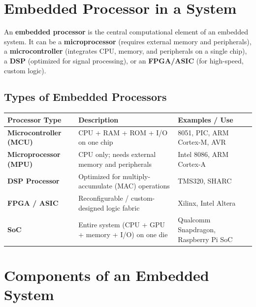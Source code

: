 \documentclass[12pt,a4paper]{article}
\renewcommand{\arraystretch}{1.45}
\begin{document}
\section{Embedded Processor in a System}

\begin{tcolorbox}[defbox, title={\textbf{Embedded Processor}}]
An \textbf{embedded processor} is the central computational element of an embedded system. It can be a \textbf{microprocessor} (requires external memory and peripherals), a \textbf{microcontroller} (integrates CPU, memory, and peripherals on a single chip), a \textbf{DSP} (optimized for signal processing), or an \textbf{FPGA/ASIC} (for high-speed, custom logic).
\end{tcolorbox}

\subsection{Types of Embedded Processors}

\par\noindent
{\renewcommand{\arraystretch}{1.6}%
\begin{tabularx}{\linewidth}{|B{3.0cm}|Y|Y|}
\hline
\textbf{Processor Type} & \textbf{Description} & \textbf{Examples / Use} \\
\hline
\textbf{Microcontroller (MCU)} & CPU + RAM + ROM + I/O on one chip & 8051, PIC, ARM Cortex-M, AVR \\
\hline
\textbf{Microprocessor (MPU)} & CPU only; needs external memory and peripherals & Intel 8086, ARM Cortex-A \\
\hline
\textbf{DSP Processor} & Optimized for multiply-accumulate (MAC) operations & TMS320, SHARC \\
\hline
\textbf{FPGA / ASIC} & Reconfigurable / custom-designed logic fabric & Xilinx, Intel Altera \\
\hline
\textbf{SoC} & Entire system (CPU + GPU + memory + I/O) on one die & Qualcomm Snapdragon, Raspberry Pi SoC \\
\hline
\end{tabularx}}

\section{Components of an Embedded System}
\end{document}
